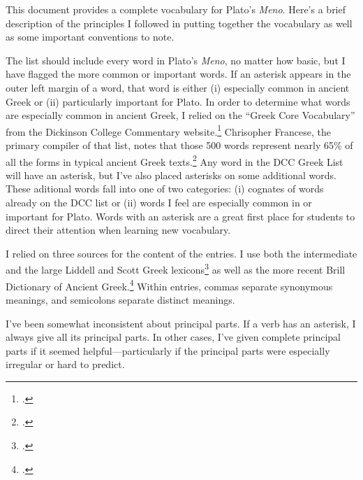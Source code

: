 \documentclass[12pt,letterpaper]{article}
\begin{document}

\reversemarginpar

This document provides a complete vocabulary for Plato's \textit{Meno}. Here's a brief description of the principles I followed in putting together the vocabulary as well as some important conventions to note.

The list should include every word in Plato's \textit{Meno}, no matter how basic, but I have flagged the more common or important words. If an asterisk appears in the outer left margin of a word, that word is either (i) especially common in ancient Greek or (ii) particularly important for Plato. In order to determine what words are especially common in ancient Greek, I relied on the ``Greek Core Vocabulary'' from the Dickinson College Commentary website.\footcite{cfrancese2014} Chrisopher Francese, the primary compiler of that list, notes that those 500 words represent nearly 65\% of all the forms in typical ancient Greek texts.\footcite{cfrancese2013} Any word in the DCC Greek List will have an asterisk, but I've also placed asterisks on some additional words. These aditional words fall into one of two categories: (i) cognates of words already on the DCC list or (ii) words I feel are especially common in or important for Plato. Words with an asterisk are a great first place for students to direct their attention when learning new vocabulary.

I relied on three sources for the content of the entries. I use both the intermediate and the large Liddell and Scott Greek lexicons\footcite{middleliddell,greatscott} as well as the more recent Brill Dictionary of Ancient Greek.\footcite{montanari2015} Within entries, commas separate synonymous meanings, and semicolons separate distinct meanings.

I've been somewhat inconsistent about principal parts. If a verb has an asterisk, I always give all its principal parts. In other cases, I've given complete principal parts if it seemed helpful—particularly if the principal parts were especially irregular or hard to predict.

\clearpage
\end{document}

